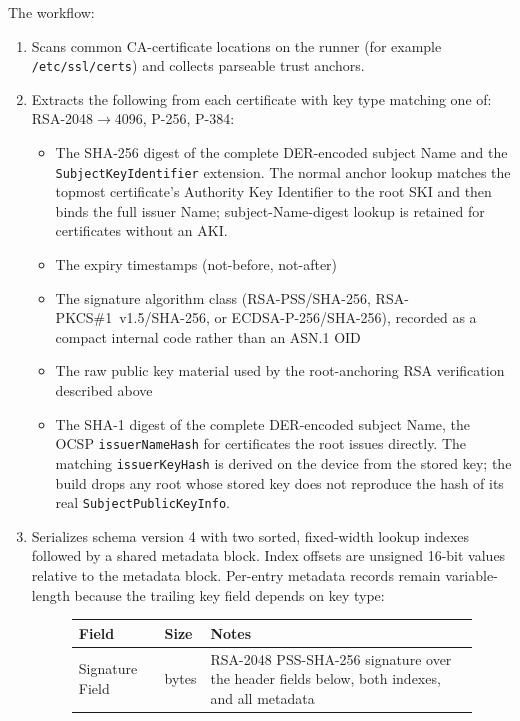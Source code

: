 \documentclass[titlepage]{report}
\begin{document}
	The workflow:
	\begin{enumerate}
		\item Scans common CA-certificate locations on the runner (for example \texttt{/etc/ssl/certs}) and collects parseable trust anchors.
		\item Extracts the following from each certificate with key type matching one of: RSA-2048$\rightarrow$4096, P-256, P-384:
		\begin{itemize}
			\item The SHA-256 digest of the complete DER-encoded subject Name and the \texttt{SubjectKeyIdentifier} extension. The normal anchor lookup matches the topmost certificate's Authority Key Identifier to the root SKI and then binds the full issuer Name; subject-Name-digest lookup is retained for certificates without an AKI.
			\item The expiry timestamps (not-before, not-after)
			\item The signature algorithm class (RSA-PSS/SHA-256, RSA-PKCS\#1~v1.5/SHA-256, or ECDSA-P-256/SHA-256), recorded as a compact internal code rather than an ASN.1 OID
			\item The raw public key material used by the root-anchoring RSA verification described above
			\item The SHA-1 digest of the complete DER-encoded subject Name, the OCSP \texttt{issuerNameHash} for certificates the root issues directly. The matching \texttt{issuerKeyHash} is derived on the device from the stored key; the build drops any root whose stored key does not reproduce the hash of its real \texttt{SubjectPublicKeyInfo}.
		\end{itemize}
		\item Serializes schema version 4 with two sorted, fixed-width lookup indexes followed by a shared metadata block. Index offsets are unsigned 16-bit values relative to the metadata block. Per-entry metadata records remain variable-length because the trailing key field depends on key type:
		\begin{figure}[H]
			\centering
			\scriptsize
			\begin{tabularx}{0.92\textwidth}{@{}>{\raggedright\arraybackslash}X>{\centering\arraybackslash}m{2.4cm}>{\raggedright\arraybackslash}X@{}}
				\toprule
				\rowcolor{gray!18}
				Field & Size & Notes \\
				\midrule
				Signature Field & 256 bytes & RSA-2048 PSS-SHA-256 signature over the header fields below, both indexes, and all metadata \\

\end{tabularx}
\end{figure}
\end{enumerate}
\end{document}
